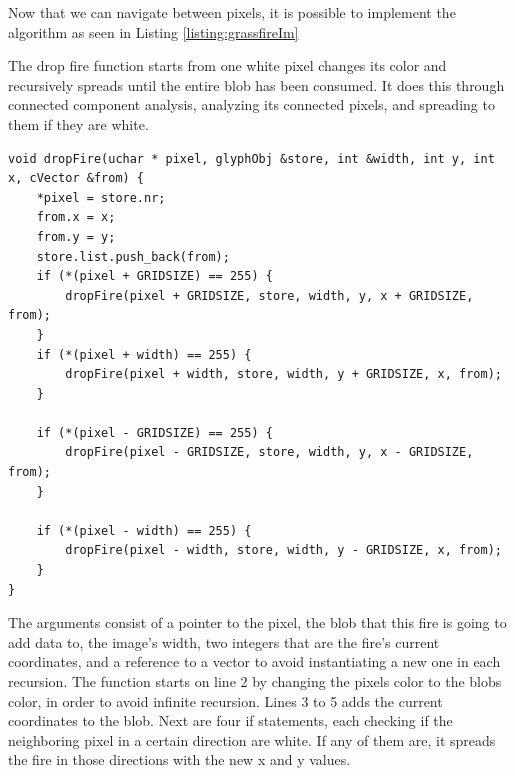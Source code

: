  Now that we can navigate between pixels, it is possible to implement the algorithm as seen in Listing \ref{listing:grassfireIm}
\begin{listing}[H]
	\caption{The drop fire function starts from one white pixel changes its color and recursively spreads until the entire blob has been consumed. It does this through connected component analysis, analyzing its connected pixels, and spreading to them if they are white.}
	\begin{verbatim}
void dropFire(uchar * pixel, glyphObj &store, int &width, int y, int x, cVector &from) {
	*pixel = store.nr;
	from.x = x;
	from.y = y;
	store.list.push_back(from);
	if (*(pixel + GRIDSIZE) == 255) {
		dropFire(pixel + GRIDSIZE, store, width, y, x + GRIDSIZE, from);
	}
	if (*(pixel + width) == 255) {
		dropFire(pixel + width, store, width, y + GRIDSIZE, x, from);
	}
	
	if (*(pixel - GRIDSIZE) == 255) {
		dropFire(pixel - GRIDSIZE, store, width, y, x - GRIDSIZE, from);
	}
	
	if (*(pixel - width) == 255) {
		dropFire(pixel - width, store, width, y - GRIDSIZE, x, from);
	}
}
	\end{verbatim}
	\label{listing:grassfireIm}
\end{listing} 
The arguments consist of a pointer to the pixel, the blob that this fire is going to add data to, the image's width, two integers that are the fire's current coordinates, and a reference to a vector to avoid instantiating a new one in each recursion. The function starts on line 2 by changing the pixels color to the blobs color, in order to avoid infinite recursion. Lines 3 to 5 adds the current coordinates to the blob. Next are four if statements, each checking if the neighboring pixel in a certain direction are white. If any of them are, it spreads the fire in those directions with the new x and y values.\\

